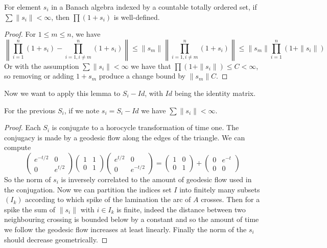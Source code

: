 \begin{lem}
For element $s_i$ in a Banach algebra indexed by a countable totally ordered set, if $\sum \| s_i \| < \infty$, then $\prod(1+s_i)$ is well-defined.
\end{lem}
\begin{proof}
For $1 \leq m \leq n$, we have \[
\left\| \prod_{i=1}^n(1+s_i)-\prod_{i=1,i \neq m}^n (1+s_i) \right\| \leq \|s_m \| \left\| \prod_{i=1,i \neq m}^n (1+s_i) \right\| \leq \|s_m \| \prod_{i=1}^n (1+\|s_i\|)
\]
Or with the assumption $\sum \| s_i \| < \infty$ we have that $\prod(1+\|s_i\|) \leq C < \infty$, so removing or adding $1+s_m$ produce a change bound by $\|s_m\| C$.
\end{proof}

Now we want to apply this lemma to $S_i - Id$, with $Id$ being the identity matrix.

\begin{lem}
For the previous $S_i$, if we note $s_i=S_i - Id$ we have $\sum \| s_i \| < \infty$.
\end{lem}

\begin{proof}
Each $S_i$ is conjugate to a horocycle transformation of time one. The conjugacy is made by a geodesic flow along the edges of the triangle. We can compute \[
\begin{pmatrix} e^{-t/2} & 0 \\ 0 & e^{t/2} \end{pmatrix}  \begin{pmatrix} 1 & 1 \\ 0 & 1 \end{pmatrix} \begin{pmatrix} e^{t/2} & 0 \\ 0 & e^{-t/2} \end{pmatrix} = \begin{pmatrix} 1 & 0 \\ 0 & 1 \end{pmatrix}+ \begin{pmatrix} 0 & e^{-t} \\ 0 & 0 \end{pmatrix}
\]
So the norm of $s_i$ is inversely correlated to the amount of geodesic flow used in the conjugation.
Now we can partition the indices set $I$ into finitely many subsets $(I_k)$ according to which spike of the lamination the arc of $A$ crosses.
Then for a spike the sum of $\|s_i \|$ with $i \in I_k$ is finite, indeed the distance between two neighbouring crossing is bounded below by a constant and so the amount of time we follow the geodesic flow increases at least linearly. Finally the norm of the $s_i$ should decrease geometrically.
\end{proof}

